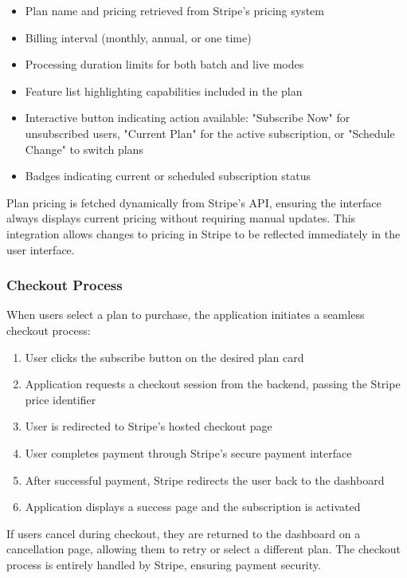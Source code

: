 \begin{itemize}
    \item Plan name and pricing retrieved from Stripe's pricing system
    \item Billing interval (monthly, annual, or one time)
    \item Processing duration limits for both batch and live modes
    \item Feature list highlighting capabilities included in the plan
    \item Interactive button indicating action available: "Subscribe Now" for unsubscribed users, "Current Plan" for the active subscription, or "Schedule Change" to switch plans
    \item Badges indicating current or scheduled subscription status
\end{itemize}

Plan pricing is fetched dynamically from Stripe's API, ensuring the interface always displays current pricing without requiring manual updates. This integration allows changes to pricing in Stripe to be reflected immediately in the user interface.

\subsubsection{Checkout Process}

When users select a plan to purchase, the application initiates a seamless checkout process:

\begin{enumerate}
    \item User clicks the subscribe button on the desired plan card
    \item Application requests a checkout session from the backend, passing the Stripe price identifier
    \item User is redirected to Stripe's hosted checkout page
    \item User completes payment through Stripe's secure payment interface
    \item After successful payment, Stripe redirects the user back to the dashboard
    \item Application displays a success page and the subscription is activated
\end{enumerate}

If users cancel during checkout, they are returned to the dashboard on a cancellation page, allowing them to retry or select a different plan. The checkout process is entirely handled by Stripe, ensuring payment security.

